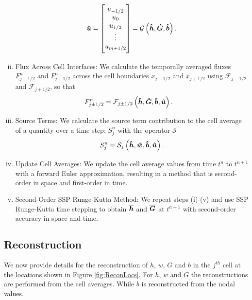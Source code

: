 \begin{enumerate}[(i)]
	\begin{equation*}
	\vecn{\hat{u}} = 
	\begin{bmatrix} \TM	u_{-1/2} \\ u_0 \\ u_{1/2} \\ \vdots \\ u_{m+1/2} \BM
	\end{bmatrix} = \mathcal{G}\left( \vecn{\hat{h}}, \vecn{\hat{G}},\vecn{\hat{b}} \right).
	\end{equation*}
	\item Flux Across Cell Interfaces: We calculate the temporally averaged fluxes $F^n_{j-1/2}$ and $F^n_{j+1/2}$ across the cell boundaries $x_{j-1/2}$ and $x_{j+1/2}$ using $\mathcal{F}_{j-1/2}$ and $\mathcal{F}_{j+1/2}$, so that
		\begin{align*}	
		F^n_{j\pm 1/2} &=\mathcal{F}_{j\pm 1/2} \left( \boldsymbol{\hat{h}}, \boldsymbol{\hat{G}},\boldsymbol{\hat{b}}, \boldsymbol{\hat{u}}  \right).
		\end{align*}
	\item Source Terms: We calculate the source term contribution to the cell average of a quantity over a time step; $S^n_{j}$ with the operator $\mathcal{S}$
	\begin{equation*}	
	S^n_{j} =\mathcal{S}_{j} \left( \boldsymbol{\hat{h}},\boldsymbol{\hat{w}},\boldsymbol{\hat{b}}, \boldsymbol{\hat{u}}  \right).
	\end{equation*}
	\item Update Cell Averages: We update the cell average values from time $t^n$ to $t^{n+1}$ with a forward Euler approximation, resulting in a method that is second-order in space and first-order in time.
	\item Second-Order SSP Runge-Kutta Method: We repeat steps (i)-(v) and use SSP Runge-Kutta time stepping to obtain $\overline{\boldsymbol{h}}$ and $\overline{\boldsymbol{G}}$ at $t^{n+1}$ with second-order accuracy in space and time.
\end{enumerate}


\subsection{Reconstruction}
\label{subsec:Reconstruction}
We now provide details for the reconstruction of $h$, $w$, $G$ and $b$ in the $j^{th}$ cell at the locations shown in Figure \ref{fig:ReconLocs}. For $h$, $w$ and $G$ the reconstructions are performed from the cell averages. While $b$ is reconstructed from the nodal values.

